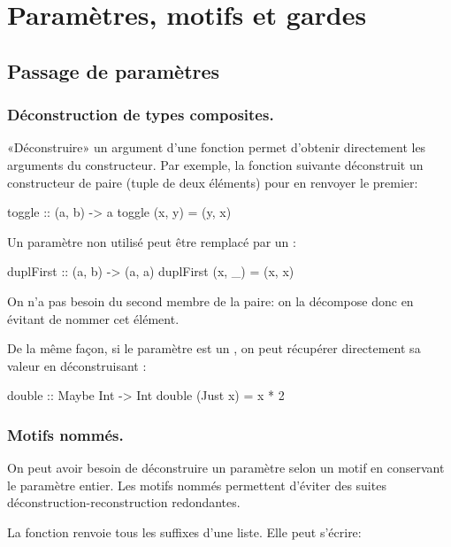 \section{Paramètres, motifs et gardes}
\label{handling-parameters}

\subsection{Passage de paramètres}

\todo{}

\subsubsection{Déconstruction de types composites.}

«Déconstruire» un argument d'une fonction permet d'obtenir directement les arguments du constructeur. Par exemple, la fonction suivante déconstruit un constructeur de paire (tuple de deux éléments) pour en renvoyer le premier:

\begin{haskellcode}
toggle :: (a, b) -> a
toggle (x, y) = (y, x)
\end{haskellcode}

Un paramètre non utilisé peut être remplacé par un \hs{_}:

\begin{haskellcode}
duplFirst :: (a, b) -> (a, a)
duplFirst (x, _) = (x, x)
\end{haskellcode}

On n'a pas besoin du second membre de la paire: on la décompose donc en évitant de nommer cet élément.

De la même façon, si le paramètre est un , on peut récupérer directement sa valeur en déconstruisant :

\begin{haskellcode}
double :: Maybe Int -> Int
double (Just x) = x * 2
\end{haskellcode}

\subsubsection{Motifs nommés.}
\label{as-patterns}

On peut avoir besoin de déconstruire un paramètre selon un motif en conservant le paramètre entier. Les motifs nommés permettent d'éviter des suites déconstruction-reconstruction redondantes.

La fonction  \parencite[103]{OSullivan2008} renvoie tous les suffixes d'une liste. Elle peut s'écrire:

